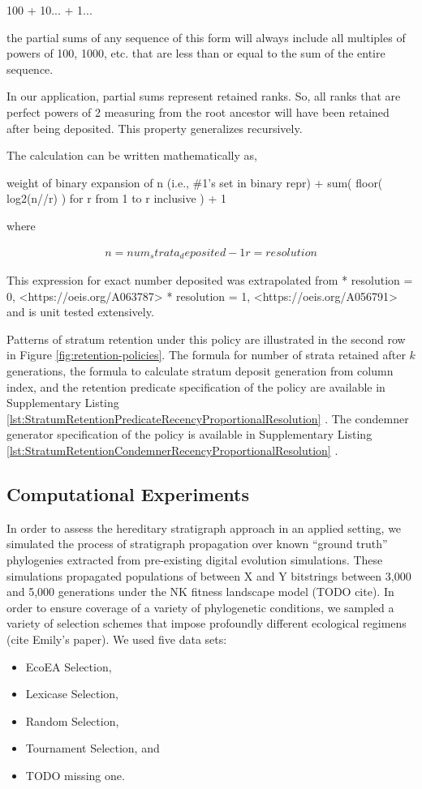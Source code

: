    100 + 10... + 1...

the partial sums of any sequence of this form will always include all
multiples of powers of 100, 1000, etc. that are less than or equal to
the sum of the entire sequence.

In our application, partial sums represent retained ranks. So, all
ranks that are perfect powers of 2 measuring from the root ancestor
will have been retained after being deposited. This property
generalizes recursively.

The calculation can be written mathematically as,

  weight of binary expansion of n (i.e., \#1's set in binary repr)
  + sum(
      floor( log2(n//r) )
      for r from 1 to r inclusive
  )
  + 1

where

\begin{align*}
  n = num_strata_deposited - 1
  r = resolution
\end{align*}

This expression for exact number deposited was extrapolated from
    * resolution = 0, <https://oeis.org/A063787> \citep{sloane2021a063787}
    * resolution = 1, <https://oeis.org/A056791> \citep{sloane2021a056791}
and is unit tested extensively.

Patterns of stratum retention under this policy are illustrated in the second row in Figure \ref{fig:retention-policies}.
The formula for number of strata retained after $k$ generations, the formula to calculate stratum deposit generation from column index, and the retention predicate specification of the policy are available in Supplementary Listing \ref{lst:StratumRetentionPredicateRecencyProportionalResolution} \citep{moreno2022hstratconceptsupplement}.
The condemner generator specification of the policy is available in Supplementary Listing \ref{lst:StratumRetentionCondemnerRecencyProportionalResolution} \citep{moreno2022hstratconceptsupplement}.


\subsection{Computational Experiments}

In order to assess the hereditary stratigraph approach in an applied setting, we simulated the process of stratigraph propagation over known ``ground truth'' phylogenies extracted from pre-existing digital evolution simulations.
These simulations propagated populations of between X and Y bitstrings between 3,000 and 5,000 generations under the NK fitness landscape model (TODO cite).
In order to ensure coverage of a variety of phylogenetic conditions, we sampled a variety of selection schemes that impose profoundly different ecological regimens (cite Emily's paper).
We used five data sets:
\begin{itemize}
  \item EcoEA Selection,
  \item Lexicase Selection,
  \item Random Selection,
  \item Tournament Selection, and
  \item TODO missing one.
\end{itemize}

